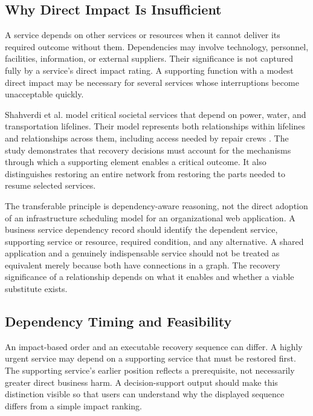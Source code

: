 \subsection{Why Direct Impact Is Insufficient}

A service depends on other services or resources when it cannot deliver its required outcome without them. Dependencies may involve technology, personnel, facilities, information, or external suppliers. Their significance is not captured fully by a service's direct impact rating. A supporting function with a modest direct impact may be necessary for several services whose interruptions become unacceptable quickly.

Shahverdi et al. model critical societal services that depend on power, water, and transportation lifelines. Their model represents both relationships within lifelines and relationships across them, including access needed by repair crews \cite{shahverdi2025recovery}. The study demonstrates that recovery decisions must account for the mechanisms through which a supporting element enables a critical outcome. It also distinguishes restoring an entire network from restoring the parts needed to resume selected services.

The transferable principle is dependency-aware reasoning, not the direct adoption of an infrastructure scheduling model for an organizational web application. A business service dependency record should identify the dependent service, supporting service or resource, required condition, and any alternative. A shared application and a genuinely indispensable service should not be treated as equivalent merely because both have connections in a graph. The recovery significance of a relationship depends on what it enables and whether a viable substitute exists.

\subsection{Dependency Timing and Feasibility}

An impact-based order and an executable recovery sequence can differ. A highly urgent service may depend on a supporting service that must be restored first. The supporting service's earlier position reflects a prerequisite, not necessarily greater direct business harm. A decision-support output should make this distinction visible so that users can understand why the displayed sequence differs from a simple impact ranking.

